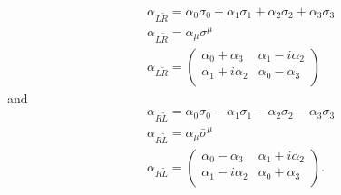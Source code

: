\begin{equation}
\begin{split}
&\alpha_{L\tilde{R}} = \alpha_0 \sigma_0 + \alpha_1 \sigma_1 + \alpha_2 \sigma_2 + \alpha_3 \sigma_3 \\
&\alpha_{L\tilde{R}} = \alpha_\mu \sigma^\mu \\
&\alpha_{L\tilde{R}} = 
\begin{pmatrix}
\alpha_0 + \alpha_3 & \alpha_1 - i\alpha_2 \\
\alpha_1 + i\alpha_2 & \alpha_0 - \alpha_3 \\
\end{pmatrix}
\end{split}
\end{equation}
and
\begin{equation}
\begin{split}
&\alpha_{R\tilde{L}} = \alpha_0 \sigma_0 - \alpha_1 \sigma_1 - \alpha_2 \sigma_2 - \alpha_3 \sigma_3 \\
&\alpha_{R\tilde{L}} = \alpha_\mu \bar{\sigma}^\mu \\
&\alpha_{R\tilde{L}} = 
\begin{pmatrix}
\alpha_0 - \alpha_3 & \alpha_1 + i\alpha_2 \\
\alpha_1 - i\alpha_2 & \alpha_0 + \alpha_3 \\
\end{pmatrix}.
\end{split}
\end{equation}


